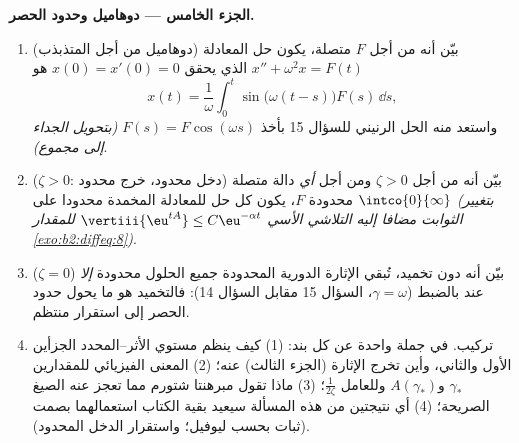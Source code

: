 \begin{problem}
\medskip
\noindent\textbf{الجزء الخامس --- دوهاميل وحدود الحصر.}
\begin{enumerate}[resume]
  \item (دوهاميل من أجل المتذبذب) بيّن أنه من أجل $F$ متصلة،
        يكون حل المعادلة $x'' + \omega^2x =
        F(t)$ الذي يحقق $x(0) = x'(0) = 0$ هو
        \[
        x(t) = \frac1\omega\int_0^t\sin\bigl(\omega(t -
        s)\bigr)F(s)\,\dd s ,
        \]
        واستعد منه الحل الرنيني للسؤال 15 بأخذ $F(s) = F\cos(\omega s)$
        \emph{(بتحويل الجداء إلى مجموع)}.
  \item ($\zeta > 0$: دخل محدود، خرج محدود) بيّن أنه من أجل $\zeta > 0$ ومن
        أجل \emph{أي} دالة متصلة محدودة $F$، يكون كل حل للمعادلة
        المخمدة محدودا على $\intco{0}{\infty}$ \emph{(بتغيير الثوابت مضافا إليه
        التلاشي الأسي $\vertiii{\eu^{tA}} \leq
        C\eu^{-\alpha t}$ للمقدار \cref{exo:b2:diffeq:8})}.
  \item ($\zeta = 0$) بيّن أنه دون تخميد، تُبقي الإثارة الدورية المحدودة
        جميع الحلول محدودة \emph{إلا} عند  بالضبط ($\gamma =
        \omega$،
        السؤال 15 مقابل السؤال 14): فالتخميد هو ما يحول حدود الحصر
        إلى استقرار منتظم.
  \item تركيب. في جملة واحدة عن كل بند: (1) كيف ينظم مستوي
        الأثر--المحدد الجزأين الأول والثاني، وأين تخرج الإثارة
        (الجزء الثالث) عنه؛ (2) المعنى الفيزيائي للمقدارين $\gamma_*$
        و$A(\gamma_*)$ وللعامل $\frac1{2\zeta}$؛ (3) ماذا تقول مبرهنتا شتورم مما
        تعجز عنه الصيغ الصريحة؛ (4) أي نتيجتين من هذه المسألة
        سيعيد بقية الكتاب استعمالهما بصمت (ثبات  بحسب
        ليوفيل؛ واستقرار الدخل المحدود).
\end{enumerate}
\end{problem}
